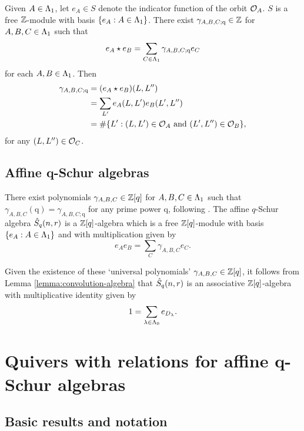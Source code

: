 \documentclass[a4paper, 11pt]{report}
\begin{document}
Given $A\in{\Lambda_1}$, let $e_A\in S$ denote the indicator function of the orbit $\mathcal{O}_{A}$. $S$ is a free $\mathbb{Z}$-module with basis $\{e_A:A\in{\Lambda_1}\}$. There exist $\gamma_{A,B,C;\mathrm{q}}\in\mathbb{Z}$ for $A,B,C\in{\Lambda_1}$ such that
\begin{equation*}
e_A\star e_B = \sum_{C\in{\Lambda_1}} \gamma_{A,B,C;\mathrm{q}}e_C
\end{equation*}
for each $A,B\in{\Lambda_1}$. Then
\begin{align*}
\gamma_{A,B,C;\mathrm{q}}
&=(e_A\star e_B)(L,L'')\\
&= \sum_{L'} e_A(L,L')e_B(L',L'')\\
&= \#\{L':(L,L')\in\mathcal{O}_{A} \text{ and }(L',L'')\in\mathcal{O}_{B}\},
\end{align*}
for any $(L,L'')\in\mathcal{O}_{C}$.

\section{Affine q-Schur algebras}

There exist polynomials $\gamma_{A,B,C}\in\mathbb{Z}[q]$ for $A,B,C\in{\Lambda_1}$ such that $\gamma_{A,B,C}(\mathrm{q}) = \gamma_{A,B,C;\mathrm{q}}$ for any prime power $\mathrm{q}$, following \cite[section 4]{lusztig99}. The affine $q$-Schur algebra $\hat{S}_q(n,r)$ is a $\mathbb{Z}[q]$-algebra which is a free $\mathbb{Z}[q]$-module with basis $\{e_A:A\in{\Lambda_1}\}$ and with multiplication given by
\begin{equation*}
e_A e_B = \sum_{C} \gamma_{A,B,C}e_C.
\end{equation*}

Given the existence of these `universal polynomials' $\gamma_{A,B,C}\in\mathbb{Z}[q]$, it follows from Lemma \ref{lemma:convolution-algebra} that $\hat{S}_q(n,r)$ is an associative $\mathbb{Z}[q]$-algebra with multiplicative identity given by
\begin{equation*}
1 = \sum_{\lambda\in{\Lambda_0}} e_{D_\lambda}.
\end{equation*}

\chapter{Quivers with relations for affine q-Schur algebras}

\section{Basic results and notation}
\end{document}
